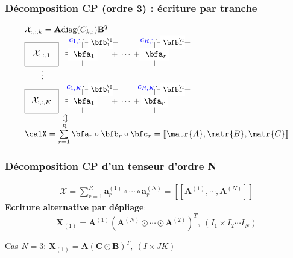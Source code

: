 \documentclass[9pt]{beamer}
\newcommand{\Blue}[1]{\textcolor{blue}{#1}}
\newcommand{\cpd}[3]{[\![#1, #2,#3]\!]}
\begin{document}
\begin{frame}
\frametitle{Décomposition CP (ordre 3) : écriture par tranche}

\[
\begin{array}{c@{}l}
&\mathcal{X}_{:,:,k} = \mathbf{A} \text{diag}(C_{k,:}) \mathbf{B}^{T}\\
 & 
\raisebox{-0.35\height}{\begin{tikzpicture}
\draw(0,0.5) node (A) {$\mathcal{X}_{:,:,1}$};
\draw(-0.7,0) rectangle (0.7,1);
\draw(1.1,0.5) node (eq) {${=}$};
\draw(1.7,0) -- (1.7,1);
\draw(1.7,0.5) node[fill=white] (a1) {{ $\bfa_1$}};
\draw(1.8,1) -- (3.18,1);
\draw(2.45,1) node[fill=white] (b1) {{\small $\bfb_1^{\T}\!\!$}};
\draw(3.5,0.5) node () {{\small $+\; \cdots\;+$}};
\draw(4.7,0) -- (4.7,1);
\draw(4.7,0.5) node[fill=white] (a1) {{ $\bfa_r$}};
\draw(4.8,1) -- (6.18,1);
\draw(5.45,1) node[fill=white] (b1) {{\small $\bfb_r^{\T}\!\!$}};

\draw(1.4,1.05) node (eq) {{ $\Blue{c_{1,1}}\cdot$}};
\draw(4.4,1.05) node (eq) {{ $\Blue{c_{R,1}}\cdot$}};
\end{tikzpicture}} \\
 & \qquad{\vdots} \\
& 
{\raisebox{-0.35\height}{\begin{tikzpicture}
\draw(0,0.5) node (A) {$\mathcal{X}_{:,:,K}$};
\draw(-0.7,0) rectangle (0.7,1);
\draw(1.1,0.5) node (eq) {${=}$};
\draw(1.7,0) -- (1.7,1);
\draw(1.7,0.5) node[fill=white] (a1) {{ $\bfa_1$}};
\draw(1.8,1) -- (3.18,1);
\draw(2.45,1) node[fill=white] (b1) {{\small $\bfb_1^{\T}\!\!$}};
\draw(3.5,0.5) node () {{\small $+\; \cdots\;+$}};
\draw(4.7,0) -- (4.7,1);
\draw(4.7,0.5) node[fill=white] (a1) {{$\bfa_r$}};
\draw(4.8,1) -- (6.18,1);
\draw(5.45,1) node[fill=white] (b1) {{\small $\bfb_r^{\T}\!\!$}};
\draw(1.35,1.05) node (eq) {{ $\Blue{c_{1,K}}\cdot$}};
\draw(4.35,1.05) node (eq) {{ $\Blue{c_{R,K}}\cdot$}};
\end{tikzpicture}}} \\
& \qquad\qquad\;\; {\Updownarrow} \\
& \calX = \sum\limits_{r=1}^{R} \bfa_r \circ \bfb_r \circ \bfc_r = \cpd{\matr{A}}{\matr{B}}{\matr{C}}
\\
\end{array}
\]
\end{frame}


\begin{frame}
\frametitle{Décomposition CP d'un tenseur d'ordre N}
\begin{gather*} 
\mathcal{X} = \sum_{r=1}^R  \mathbf{a}_{r}^{(1)} \circ \cdots \circ \mathbf{a}_{r}^{(N)}=[\![ \mathbf{A}^{(1)}, \cdots , \mathbf{A}^{(N)}]\!] 
\end{gather*}
\textbf{Ecriture alternative par dépliage}: 
\[
\mathbf{X}_{(1)} =\mathbf{A}^{(1)}  (\mathbf{A}^{(N)} \odot \cdots \odot \mathbf{A}^{(2)})^T, \ {(I_1 \times I_2 \cdots I_N)}
\]


Cas $N=3$: $\mathbf{X}_{(1)} =\mathbf{A}   (\mathbf{C} \odot \mathbf{B})^T, \ {(I \times JK)}$
\end{frame}
\end{document}
